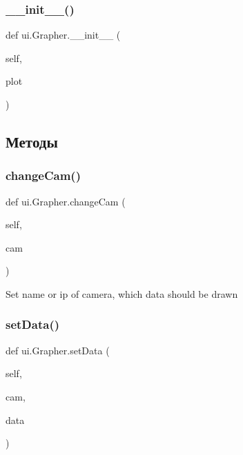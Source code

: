 \subsubsection{\texorpdfstring{\+\_\+\+\_\+init\+\_\+\+\_\+()}{\_\_init\_\_()}}
{\footnotesize\ttfamily def ui.\+Grapher.\+\_\+\+\_\+init\+\_\+\+\_\+ (\begin{DoxyParamCaption}\item[{}]{self,  }\item[{}]{plot }\end{DoxyParamCaption})}



\subsection{Методы}
\mbox{\label{classui_1_1_grapher_ab3993d59f2ea6e3af6009c3e0c2d8c4a}} 
\subsubsection{\texorpdfstring{change\+Cam()}{changeCam()}}
{\footnotesize\ttfamily def ui.\+Grapher.\+change\+Cam (\begin{DoxyParamCaption}\item[{}]{self,  }\item[{}]{cam }\end{DoxyParamCaption})}

\begin{DoxyVerb}Set name or ip of camera, which data should be drawn\end{DoxyVerb}
 \mbox{\label{classui_1_1_grapher_a84bfc263d057da0961099866932fa80f}} 
\subsubsection{\texorpdfstring{set\+Data()}{setData()}}
{\footnotesize\ttfamily def ui.\+Grapher.\+set\+Data (\begin{DoxyParamCaption}\item[{}]{self,  }\item[{}]{cam,  }\item[{}]{data }\end{DoxyParamCaption})}



